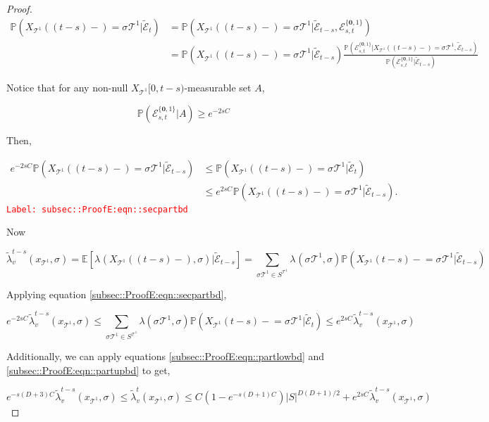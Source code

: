 \documentclass[12pt]{article}
\newcommand{\mb}{\mathbb}
\newcommand{\mc}{\mathcal}
\newcommand{\tr}{\textcolor{red}}
\newcommand{\labe}[1]{\tr{\texttt{Label: #1}}}
\newcommand{\pr}{\mb{P}}							%
\newcommand{\ex}[1]{\mb{E}\left[#1\right]}			%
\renewcommand{\root}{\mathbf{0}}				%
\renewcommand{\v}{v}							%
\renewcommand{\S}{S}							%
\newcommand{\s}{\sigma}							%
\newcommand{\sv}[1]{\s^{#1}}					%
\renewcommand{\t}{t}							%
\newcommand{\degr}{D}								%
\newcommand{\pup}[1]{^{#1}}							%
\newcommand{\tree}{\mc{T}}							%
\renewcommand{\tt}{s}								%
\newcommand{\XState}[1]{\S^{#1}}				%
\newcommand{\rxvt}[2]{X_{#1}{(#2)}}					%
\newcommand{\xvts}[2]{x_{#1}{#2}}					%
\newcommand{\rxvts}[2]{X_{#1}{#2}}					%
\newcommand{\rate}[1]{\lambda_{#1}}					%
\newcommand{\crate}[2]{\alt{\lambda}_{#1}^{#2}}		%
\newcommand{\const}[1]{C_{#1}}						%
\newcommand{\alt}{\widetilde}						%
\newcommand{\evnt}{\mc{E}}						%
\newcommand{\typset}{A}							%
\begin{document}
\begin{proof}
\begin{align*}
\pr\left(\rxvt{\tree\pup{1}}{(\t-\tt)-}=\sv{}{\tree\pup{1}}|\alt{\evnt}_\t\right) &= \pr\left(\rxvt{\tree\pup{1}}{(\t-\tt)-}=\sv{}{\tree\pup{1}}|\alt{\evnt}_{\t-\tt},\evnt^{\{\root,1\}}_{\tt,\t}\right)\\
&=\pr\left(\rxvt{\tree\pup{1}}{(\t-\tt)-}=\sv{}{\tree\pup{1}}|\alt{\evnt}_{\t-\tt}\right)\frac{\pr\left(\evnt^{\{\root,1\}}_{\tt,\t}|\rxvt{\tree\pup{1}}{(\t-\tt)-}=\sv{}{\tree\pup{1}},\alt{\evnt}_{\t-\tt}\right)}{\pr\left(\evnt^{\{\root,1\}}_{\tt,\t}|\alt{\evnt}_{\t-\tt}\right)}
\end{align*}

Notice that for any non-null \(\rxvts{\tree\pup{1}}{[0,\t-\tt)}\)-measurable set \(\typset\), 

\[\pr(\evnt^{\{\root,1\}}_{\tt,\t}|\typset) \geq e^{-2\tt\const{}}\]

Then,

\begin{align}
e^{-2\tt\const{}}\pr\left(\rxvt{\tree\pup{1}}{(\t-\tt)-}=\sv{}{\tree\pup{1}}|\alt{\evnt}_{\t-\tt}\right) &\leq \pr\left(\rxvt{\tree\pup{1}}{(\t-\tt)-}=\sv{}{\tree\pup{1}}|\alt{\evnt}_{\t}\right)\nonumber\\
&\leq e^{2\tt\const{}}\pr\left(\rxvt{\tree\pup{1}}{(\t-\tt)-}=\sv{}{\tree\pup{1}}|\alt{\evnt}_{\t-\tt}\right).
\label{subsec::ProofE:eqn::secpartbd}
\end{align}
\labe{subsec::ProofE:eqn::secpartbd}

Now

\[\crate{\v}{\t-\tt}(\xvts{\tree\pup{1}}{},\s) = \ex{\rate{}(\rxvt{\tree\pup{1}}{(\t-\tt)-},\s)|\alt{\evnt}_{\t-\tt}} = \sum_{\sv{}{\tree\pup{1}}\in \S^{\tree\pup{1}}}\rate{}(\sv{}{\tree\pup{1}},\s)\pr\left(\rxvts{\tree\pup{1}}{(\t-\tt)-} = \sv{}{\tree\pup{1}}|\alt{\evnt}_{\t-\tt}\right)\]

Applying equation \eqref{subsec::ProofE:eqn::secpartbd},

\[e^{-2\tt\const{}}\crate{\v}{\t-\tt}(\xvts{\tree\pup{1}}{},\s) \leq \sum_{\sv{}{\tree\pup{1}}\in \S^{\tree\pup{1}}} \lambda(\sv{}{\tree\pup{1}},\s)\pr(\rxvts{\tree\pup{1}}{(\t-\tt)-} = \sv{}{\tree\pup{1}}|\alt{\evnt}_\t)\leq e^{2\tt\const{}}\crate{\v}{\t-\tt}(\xvts{\tree\pup{1}}{},\s)\]

Additionally, we can apply equations \eqref{subsec::ProofE:eqn::partlowbd} and  \eqref{subsec::ProofE:eqn::partupbd} to get,

\[e^{-\tt(\degr+3)\const{}}\crate{\v}{\t-\tt}(\xvts{\tree\pup{1}}{},\s) \leq \crate{\v}{\t}(\xvts{\tree\pup{1}}{},\s) \leq \const{}(1 - e^{-\tt(\degr+1)\const{}})|S|^{\degr(\degr+1)/2} + e^{2\tt\const{}}\crate{\v}{\t-\tt}(\xvts{\tree\pup{1}}{},\s)\]


\end{proof}
\end{document}
